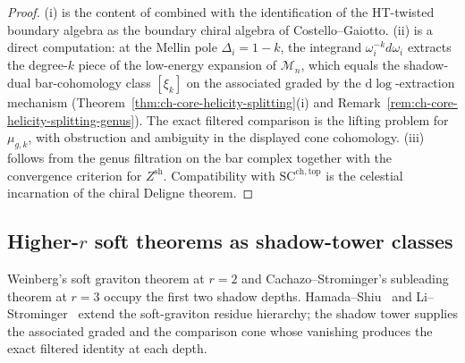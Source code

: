 \begin{proof}
\textup{(i)} is the content of \cite[\S 2]{StromingerLectures2018} combined with
the identification of the HT-twisted boundary algebra as the boundary
chiral algebra of Costello--Gaiotto. \textup{(ii)} is a direct computation: at
the Mellin pole $\Delta_i = 1-k$, the integrand $\omega_i^{-k}d\omega_i$
extracts the degree-$k$ piece of the low-energy expansion of
$\mathcal{M}_n$, which equals the shadow-dual bar-cohomology class
$[\xi_k]$ on the associated graded by the $\mathrm{d}\log$-extraction
mechanism (Theorem~\ref{thm:ch-core-helicity-splitting}(i) and
Remark~\ref{rem:ch-core-helicity-splitting-genus}). The exact
filtered comparison is the lifting problem for \(\mu_{g,k}\), with
obstruction and ambiguity in the displayed cone cohomology. \textup{(iii)}
follows from the genus filtration on the bar complex together with the convergence criterion
for \(Z^{\mathrm{sh}}\). Compatibility with
$\mathrm{SC}^{\mathrm{ch,top}}$ is the celestial incarnation of the
chiral Deligne theorem.
\end{proof}

\subsection{Higher-$r$ soft theorems as shadow-tower classes}
\label{subsec:higher-r-soft}

Weinberg's soft graviton theorem at $r=2$ and Cachazo--Strominger's subleading theorem at $r=3$ occupy the first two shadow depths. Hamada--Shiu~\cite{HamadaShiuSubsubSoft} and Li--Strominger~\cite{LiStromingerHigherSoft} extend the soft-graviton residue hierarchy; the shadow tower supplies the associated graded and the comparison cone whose vanishing produces the exact filtered identity at each depth.

